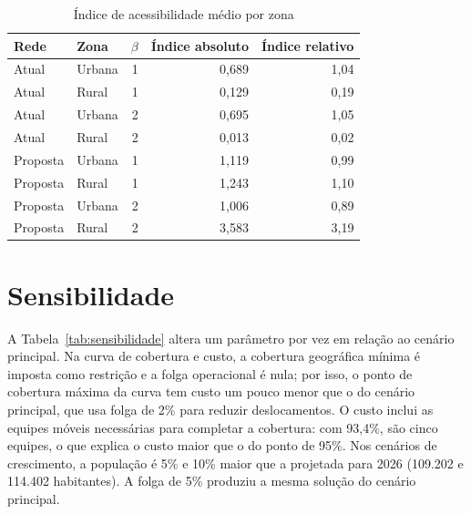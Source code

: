 \begin{table}[htbp]\centering
\caption{Índice de acessibilidade médio por zona}\label{tab:acessibilidade}
\begin{tabular}{llrrr}\toprule Rede & Zona & $\beta$ & Índice absoluto & Índice relativo\\\midrule
Atual & Urbana & 1 & 0,689 & 1,04\\
Atual & Rural & 1 & 0,129 & 0,19\\
Atual & Urbana & 2 & 0,695 & 1,05\\
Atual & Rural & 2 & 0,013 & 0,02\\
Proposta & Urbana & 1 & 1,119 & 0,99\\
Proposta & Rural & 1 & 1,243 & 1,10\\
Proposta & Urbana & 2 & 1,006 & 0,89\\
Proposta & Rural & 2 & 3,583 & 3,19\\
\bottomrule\end{tabular}
\end{table}

\section{Sensibilidade}

A Tabela~\ref{tab:sensibilidade} altera um parâmetro por vez em relação ao cenário principal. Na curva
de cobertura e custo, a cobertura geográfica mínima é imposta como restrição e a folga operacional é
nula; por isso, o ponto de cobertura máxima da curva tem custo um pouco menor que o do cenário principal,
que usa folga de 2\% para reduzir deslocamentos. O custo inclui as equipes móveis necessárias para
completar a cobertura: com 93,4\%, são cinco equipes, o que explica o custo maior que o do ponto de 95\%.
Nos cenários de crescimento, a população é 5\% e 10\% maior que a projetada para 2026 (109.202 e 114.402
habitantes). A folga de 5\% produziu a mesma solução do cenário principal.

